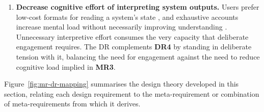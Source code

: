 \begin{enumerate}[label=\textbf{DR\arabic*}, leftmargin=*]
    \pagebreak
    \item \textbf{Decrease cognitive effort of interpreting system outputs.} Users prefer low-cost formats for reading a system's state \parencite{Ying2024}, and exhaustive accounts increase mental load without necessarily improving understanding \parencite{Miller2019}. Unnecessary interpretive effort consumes the very capacity that deliberate engagement requires. The \ac{DR} complements \textbf{DR4} by standing in deliberate tension with it, balancing the need for engagement against the need to reduce cognitive load implied in \textbf{MR3}.
\end{enumerate}

Figure~\ref{fig:mr-dr-mapping} summarises the design theory developed in this section, relating each design requirement to the meta-requirement or combination of meta-requirements from which it derives.

